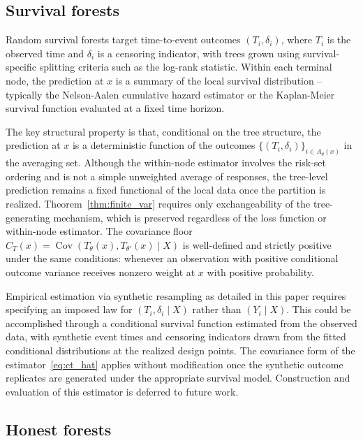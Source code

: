 \documentclass[11pt]{article}
\theoremstyle{plain}
\theoremstyle{definition}
\theoremstyle{remark}
\DeclareMathOperator{\Cov}{Cov}
\begin{document}
\subsection{Survival forests}
\label{subsec:survival}

Random survival forests \citep{ishwaran2008} target time-to-event outcomes $(T_i, \delta_i)$, where $T_i$ is the observed time and $\delta_i$ is a censoring indicator, with trees grown using survival-specific splitting criteria such as the log-rank statistic. Within each terminal node, the prediction at $x$ is a summary of the local survival distribution -- typically the Nelson-Aalen cumulative hazard estimator or the Kaplan-Meier survival function evaluated at a fixed time horizon.

The key structural property is that, conditional on the tree structure, the prediction at $x$ is a deterministic function of the outcomes $\{(T_i, \delta_i)\}_{i \in A_\theta(x)}$ in the averaging set. Although the within-node estimator involves the risk-set ordering and is not a simple unweighted average of responses, the tree-level prediction remains a fixed functional of the local data once the partition is realized. Theorem~\ref{thm:finite_var} requires only exchangeability of the tree-generating mechanism, which is preserved regardless of the loss function or within-node estimator. The covariance floor $C_T(x) = \Cov(T_\theta(x), T_{\theta'}(x) \mid X)$ is well-defined and strictly positive under the same conditions: whenever an observation with positive conditional outcome variance receives nonzero weight at $x$ with positive probability.

Empirical estimation via synthetic resampling as detailed in this paper requires specifying an imposed law for $(T_i, \delta_i \mid X)$ rather than $(Y_i \mid X)$. This could be accomplished through a conditional survival function estimated from the observed data, with synthetic event times and censoring indicators drawn from the fitted conditional distributions at the realized design points. The covariance form of the estimator~\eqref{eq:ct_hat} applies without modification once the synthetic outcome replicates are generated under the appropriate survival model. Construction and evaluation of this estimator is deferred to future work. 

\subsection{Honest forests}
\label{subsec:honest}
\end{document}
